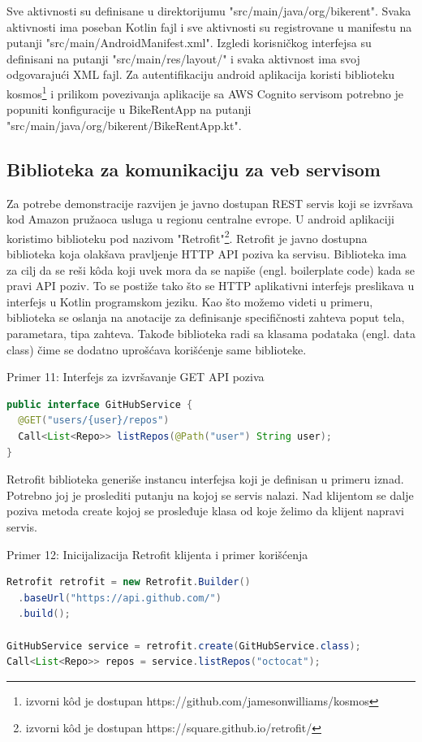 \documentclass[12pt,oneside]{memoir}
\begin{document}
Sve aktivnosti su definisane u direktorijumu "src/main/java/org/bikerent". Svaka aktivnosti ima poseban Kotlin fajl i sve aktivnosti su registrovane u manifestu na putanji "src/main/AndroidManifest.xml". Izgledi korisničkog interfejsa su definisani na putanji "src/main/res/layout/" i svaka aktivnost ima svoj odgovarajući XML fajl. Za autentifikaciju android aplikacija koristi biblioteku kosmos\footnote{izvorni kôd je dostupan https://github.com/jamesonwilliams/kosmos} i prilikom povezivanja aplikacije sa AWS Cognito servisom potrebno je popuniti konfiguracije u BikeRentApp na putanji "src/main/java/org/bikerent/BikeRentApp.kt".
 
\subsection{Biblioteka za komunikaciju za veb servisom}
 
Za potrebe demonstracije razvijen je javno dostupan REST servis koji se izvršava kod Amazon pružaoca usluga u regionu centralne evrope. U android aplikaciji koristimo biblioteku pod nazivom "Retrofit"\footnote{izvorni kôd je dostupan https://square.github.io/retrofit/}. Retrofit je javno dostupna biblioteka koja olakšava pravljenje HTTP API poziva ka servisu. Biblioteka ima za cilj da se reši kôda koji uvek mora da se napiše (engl. boilerplate code) kada se pravi API poziv. To se postiže tako što se HTTP aplikativni interfejs preslikava u interfejs u Kotlin programskom jeziku. Kao što možemo videti u primeru, biblioteka se oslanja na anotacije za definisanje specifičnosti zahteva poput tela, parametara, tipa zahteva. Takođe biblioteka radi sa klasama podataka (engl. data class) čime se dodatno uprošćava korišćenje same biblioteke.

\begin{center} Primer 11: Interfejs za izvršavanje GET API poziva\end{center}
\begin{lstlisting}[language=Java]
public interface GitHubService {
  @GET("users/{user}/repos")
  Call<List<Repo>> listRepos(@Path("user") String user);
}
\end{lstlisting}


Retrofit biblioteka generiše instancu interfejsa koji je definisan u primeru iznad. Potrebno joj je proslediti putanju na kojoj se servis nalazi. Nad klijentom se dalje poziva metoda create kojoj se prosleđuje klasa od koje želimo da klijent napravi servis.
\begin{center} Primer 12: Inicijalizacija Retrofit klijenta i primer korišćenja\end{center}
\begin{lstlisting}[language=Java]
Retrofit retrofit = new Retrofit.Builder()
  .baseUrl("https://api.github.com/")
  .build();

GitHubService service = retrofit.create(GitHubService.class);
Call<List<Repo>> repos = service.listRepos("octocat");
\end{lstlisting}
\end{document}
